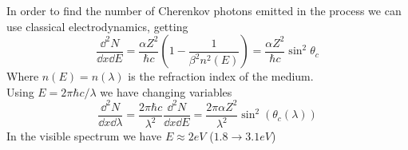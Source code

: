\documentclass[../qm.tex]{subfiles}
\begin{document}
In order to find the number of Cherenkov photons emitted in the process we can use classical electrodynamics, getting
\begin{equation}
	\frac{\dd^2N}{\dd x\dd E}=\frac{\alpha Z^2}{\hbar c}\left( 1-\frac{1}{\beta^2n^2(E)} \right)=\frac{\alpha Z^2}{\hbar c}\sin^2\theta_c
	\label{eq:cherenkovphotonnumber}
\end{equation}
Where $n(E)=n(\lambda)$ is the refraction index of the medium.\\
Using $E=2\pi\hbar c/\lambda$ we have changing variables
\begin{equation}
	\frac{\dd^2N}{\dd x\dd\lambda}=\frac{2\pi\hbar c}{\lambda^2}\frac{\dd^2N}{\dd x\dd E}=\frac{2\pi\alpha Z^2}{\lambda^2}\sin^2\left( \theta_c(\lambda) \right)
	\label{eq:numberphotonwlcherenkov}
\end{equation}
In the visible spectrum we have $E\approx2\unit{eV}$ ($1.8\to3.1\unit{eV}$)
\end{document}
